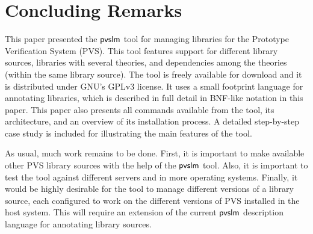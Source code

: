 \section{Concluding Remarks}
\label{sec.concl}

This paper presented the $\textsf{pvslm}$ tool for managing libraries for the
Prototype Verification System (PVS). This tool features support for
different library sources, libraries with several theories, and
dependencies among the theories (within the same library source).  The
tool is freely available for download and it is distributed under
GNU's GPLv3 license. It uses a small footprint language for annotating
libraries, which is described in full detail in BNF-like notation in
this paper. This paper also presents all commands available from the
tool, its architecture, and an overview of its installation process.
A detailed step-by-step case study is included for illustrating the
main features of the tool.

As usual, much work remains to be done. First, it is important to make
available other PVS library sources with the help of the $\textsf{pvslm}$
tool.  Also, it is important to test the tool against different
servers and in more operating systems. Finally, it would be highly
desirable for the tool to manage different versions of a library
source, each configured to work on the different versions of PVS
installed in the host system. This will require an extension of the
current $\textsf{pvslm}$ description language for annotating library sources.
